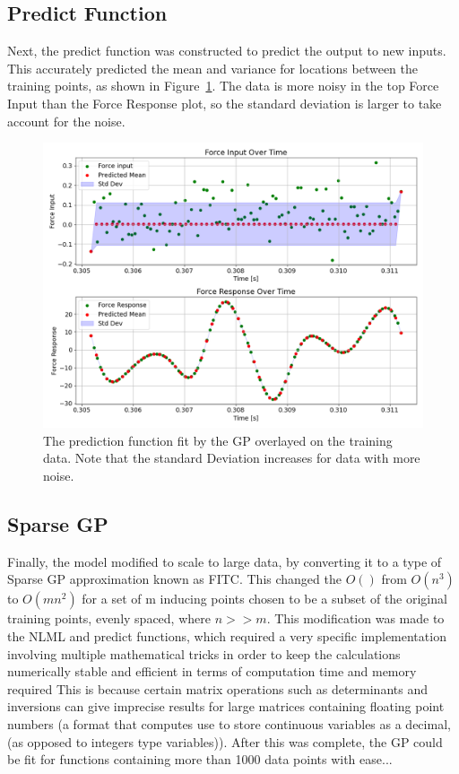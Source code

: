 \documentclass[12pt]{article}
\begin{document}
    \subsection{Predict Function}
    Next, the predict function was constructed to predict the output to new inputs.
    This accurately predicted the mean and variance for locations between the training points, as shown in Figure~\ref{fig:input-response-predict}.
    The data is more noisy in the top Force Input than the Force Response plot, so the standard deviation is larger to take account for the noise.

    \begin{figure}[ht]
        \centering
        \includegraphics[width=1.0\linewidth]{figures/input-response-predict/input-response-predict.png}
        \caption{The prediction function fit by the GP overlayed on the training data. Note that the standard Deviation increases for data with more noise.}
        \label{fig:input-response-predict}
    \end{figure}

    \subsection{Sparse GP}
    Finally, the model modified to scale to large data, by converting it to a type of Sparse GP approximation known as FITC.
    This changed the $O()$ from $O(n^3)$ to $O(mn^2)$ for a set of m inducing points chosen to be a subset of the original training points, evenly spaced, where $n >> m$.
    This modification was made to the NLML and predict functions, which required a very specific implementation involving multiple mathematical tricks in order to keep the calculations numerically stable and efficient in terms of computation time and memory required
    This is because certain matrix operations such as determinants and inversions can give imprecise results for large matrices containing floating point numbers (a format that computes use to store continuous variables as a decimal, (as opposed to integers type variables)).
    After this was complete, the GP could be fit for functions containing more than 1000 data points with ease...
\end{document}
